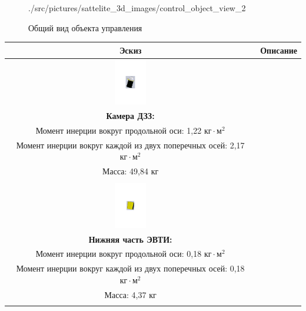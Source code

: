 \begin{figure}[ht!]
\begin{minipage}{0.5\textwidth}
                        {./src/pictures/sattelite_3d_images/control_object_view_2}
        \label{control_object_view_2}
    \end{minipage}

    \caption{Общий вид объекта управления}
    \label{control_object_general_view}
\end{figure}

\begin{table}[ht!]
    \centering
    \begin{tabular}{|c|c|}
        \hline
            Эскиз & Описание \\
        \hline
            \includegraphics[height=20mm, keepaspectratio]
                            {./src/pictures/sattelite_3d_images/camera} &
            \shortstack[l] {
                \rule{0pt}{2mm} \\
                \textbf{Камера ДЗЗ:} \\
                Момент инерции вокруг продольной оси: 1,22 $\text{кг} \cdot \text{м}^{2}$ \\
                Момент инерции вокруг каждой из двух поперечных  осей: 2,17 $\text{кг} \cdot \text{м}^{2}$ \\
                Масса: 49,84 кг \\
                \rule{0pt}{2mm}
            } \\
        \hline
            \includegraphics[height=20mm, keepaspectratio]
                            {./src/pictures/sattelite_3d_images/bottom_shell_part} &
            \shortstack[l] {
                \rule{0pt}{2mm} \\
                \textbf{Нижняя часть ЭВТИ:} \\
                Момент инерции вокруг продольной оси: 0,18 $\text{кг} \cdot \text{м}^{2}$ \\
                Момент инерции вокруг каждой из двух поперечных  осей: 0,18 $\text{кг} \cdot \text{м}^{2}$ \\
                Масса: 4,37 кг \\
}
\end{tabular}
\end{table}
